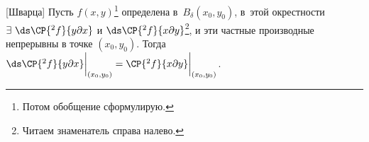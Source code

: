 [Шварца]\label{Shvc}
	 Пусть $f(x,y)$\footnote{Потом обобщение сформулирую.} определена в~$B_\delta(x_0,y_0)$, в~этой окрестности $\exists\ 
	 \ds\CP{^2f}{y\partial x}$ и $\ds\CP{^2f}{x\partial y}$\footnote{Читаем знаменатель справа налево.}, и эти частные производные непрерывны
	 в точке $(x_0,y_0)$. Тогда $\ds\CP{^2f}{y\partial x}\bigg|_{(x_0,y_0)} = \CP{^2f}{x\partial y}\bigg|_{(x_0,y_0)}$.
	 